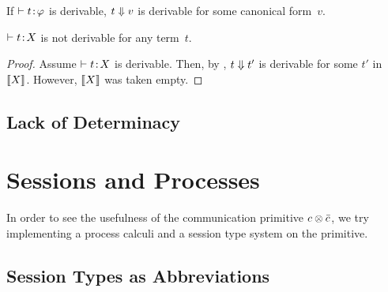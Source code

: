    \begin{corollary}
    \label{convergence}
    If $\vdash{t} \mathord{\colon\kern -2pt}{\varphi}$ is derivable,
    $t\Downarrow v$ is derivable for some canonical form~$v$.
   \end{corollary}

   \begin{corollary}
    \label{consistent-amida}
    $\vdash{t} \mathord{\colon\kern -2pt}{X}$ is not derivable for any term~$t$.
   \end{corollary}
    \begin{proof}
     Assume $\vdash{t} \mathord{\colon\kern -2pt}{X}$ is derivable.
     Then, by ,
     $t\Downarrow t'$ is derivable for some $t'$ in $\llbracket{X}\rrbracket$.
     However, $\llbracket{X}\rrbracket$ was taken empty.
    \end{proof}

    \subsection{Lack of Determinacy}


    \section{Sessions and Processes}
    \label{sec:session-process}

    In order to see the usefulness of the communication primitive
    $c\otimes \bar{c}$,
    we try implementing a process calculi and a session type system on
    the primitive.

    \subsection{Session Types as Abbreviations}

